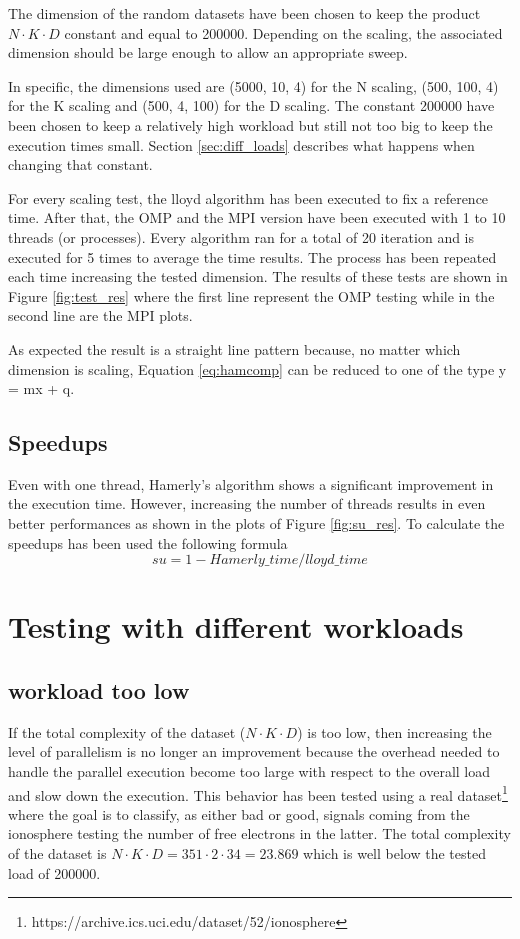 \documentclass[conference]{IEEEtran}
\begin{document}
The dimension of the random datasets have been chosen to keep the product $N\cdot K\cdot D$ constant and equal to 200000. Depending on the scaling, the associated dimension should be large enough to allow an appropriate sweep. 

In specific, the dimensions used are (5000, 10, 4) for the N scaling, (500, 100, 4) for the K scaling and (500, 4, 100) for the D scaling. The constant 200000 have been chosen to keep a relatively high workload but still not too big to keep the execution times small. Section \ref{sec:diff_loads} describes what happens when changing that constant.

For every scaling test, the lloyd algorithm has been executed to fix a reference time. After that, the OMP and the MPI version have been executed with 1 to 10 threads (or processes). Every algorithm ran for a total of 20 iteration and is executed for 5 times to average the time results. The process has been repeated each time increasing the tested dimension. The results of these tests are shown in Figure \ref{fig:test_res} where the first line represent the OMP testing while in the second line are the MPI plots.

As expected the result is a straight line pattern because, no matter which dimension is scaling, Equation \ref{eq:hamcomp} can be reduced to one of the type y = mx + q.

\subsection{Speedups}
Even with one thread, Hamerly's algorithm shows a significant improvement in the execution time. However, increasing the number of threads results in even better performances as shown in the plots of Figure \ref{fig:su_res}. To calculate the speedups has been used the following formula
\begin{equation}
  su = 1 - Hamerly\_time / lloyd\_time
\end{equation}

\section{Testing with different workloads\label{sec:diff_loads}}
\subsection{workload too low}
If the total complexity of the dataset ($N\cdot K\cdot D$) is too low, then increasing the level of parallelism is no longer an improvement because the overhead needed to handle the parallel execution become too large with respect to the overall load and slow down the execution. This behavior has been tested using a real dataset\footnote{https://archive.ics.uci.edu/dataset/52/ionosphere} where the goal is to classify, as either bad or good, signals coming from the ionosphere testing the number of free electrons in the latter. The total complexity of the dataset is $N\cdot K\cdot D = 351 \cdot 2\cdot 34 = 23.869$ which is well below the tested load of 200000.
\end{document}
